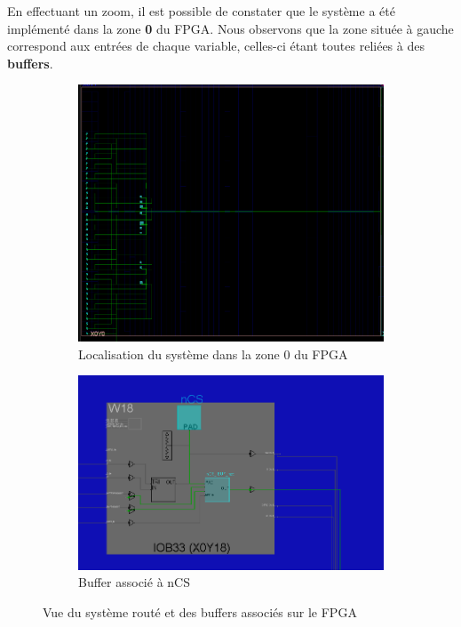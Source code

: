 En effectuant un zoom, il est possible de constater que le système a été implémenté dans la zone \textbf{0} du FPGA. 
Nous observons que la zone située à gauche correspond aux entrées de chaque variable, 
celles-ci étant toutes reliées à des \textbf{buffers}.

\begin{figure}[H]
    \centering
    \begin{subfigure}[b]{0.45\linewidth}
        \centering
        \includegraphics[width=\linewidth]{images/Routage/Rout_2.png}
        \caption{Localisation du système dans la zone 0 du FPGA}
        \label{fig:rout_zone0}
    \end{subfigure}
    \hfill
    \begin{subfigure}[b]{0.50\linewidth}
        \centering
        \includegraphics[width=\linewidth]{images/Routage/buff.png}
        \caption{Buffer associé à nCS}
        \label{fig:buff_ncs}
    \end{subfigure}
    \caption{Vue du système routé et des buffers associés sur le FPGA}
    \label{fig:rout_buff}
\end{figure}



